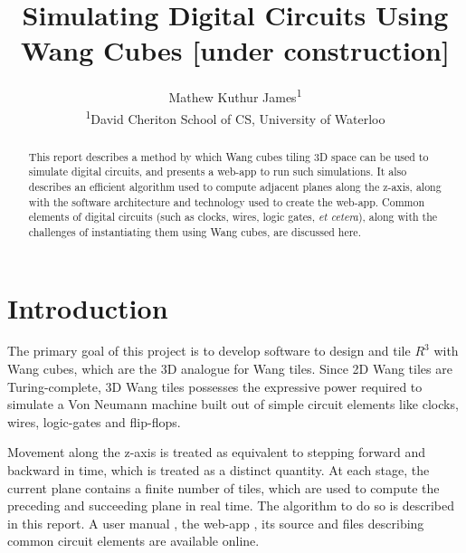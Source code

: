 \documentclass[letterpaper,11pt]{article}
\title{Simulating Digital Circuits Using Wang Cubes [under construction]}
\author{Mathew Kuthur James\textsuperscript{1}
\vspace{10pt}\\
\textsuperscript{1}David Cheriton School of CS, University of Waterloo} %
\date{}					%
\begin{document}
\maketitle

\thispagestyle{empty}

\begin{abstract}

This report describes a method by which Wang cubes tiling 3D space can be used to simulate digital circuits, and presents a web-app to run such simulations. It also describes an efficient algorithm used to compute adjacent planes along the z-axis, along with the software architecture and technology used to create the web-app. Common elements of digital circuits (such as clocks, wires, logic gates, \emph{et cetera}), along with the challenges of instantiating them using Wang cubes, are discussed here.

\end{abstract}


\section*{Introduction}

The primary goal of this project is to develop software to design and tile $R^3$ with Wang cubes, which are the 3D analogue for Wang tiles. Since 2D Wang tiles are Turing-complete, 3D Wang tiles possesses the expressive power required to simulate a Von Neumann machine built out of simple circuit elements like clocks, wires, logic-gates and flip-flops. 

Movement along the z-axis is treated as equivalent to stepping forward and backward in time, which is treated as a distinct quantity. At each stage, the current plane contains a finite number of tiles, which are used to compute the preceding and succeeding plane in real time. The algorithm to do so is described in this report. A user manual \cite{manual}, the web-app \cite{web-app}, its source \cite{web-app-source} and files describing common circuit elements \cite{wang-file} are available online.
\end{document}
